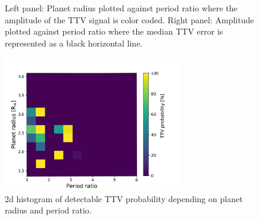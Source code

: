 \documentclass[12pt]{report}
\begin{document}
\begin{figure}
\begin{minipage}{.5\textwidth}
\end{minipage}
\caption{Left panel: Planet radius plotted against period ratio where the amplitude of the TTV signal is color coded. Right panel: Amplitude plotted against period ratio where the median TTV error is represented as a black horizontal line.}
\label{fig:CHEOPS_perRatio}
\end{figure}

\begin{figure}
\centering
\includegraphics[width=0.7\textwidth]{img/2dhist3_new.pdf}
\caption{2d histogram of detectable TTV probability depending on planet radius and period ratio.}
\label{fig:CHEOPS_prob}
\end{figure}

\end{document}
